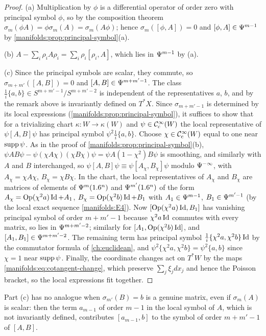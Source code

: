 \begin{proof}
(a) Multiplication by $\phi$ is a differential operator of order zero with
principal symbol $\phi$, so by the composition theorem $\sigma_m(\phi A)=\phi\sigma_m(A)=\sigma_m(A\phi)$;
hence $\sigma_m([\phi,A])=0$ and $[\phi,A]\in\Psi^{m-1}$ by
\cref{manifolds:prop:principal-symbol}(a).

(b) $A-\sum_i\rho_iA\rho_i=\sum_i\rho_i[\rho_i,A]$, which lies in $\Psi^{m-1}$ by (a).

(c) Since the principal symbols are scalar, they commute, so
$\sigma_{m+m'}([A,B])=0$ and $[A,B]\in\Psi^{m+m'-1}$. The class
$\frac1i\{a,b\}\in S^{m+m'-1}/S^{m+m'-2}$ is independent of the representatives
$a$, $b$, and by the remark above is invariantly defined on $T^*X$. Since
$\sigma_{m+m'-1}$ is determined by its local expressions
(\cref{manifolds:prop:principal-symbol}), it suffices to show that for a
trivializing chart $\kappa:W\to\kappa(W)$ and $\psi\in\mathcal{C}^\infty_{\mathrm{c}}(W)$ the local
representative of $\psi[A,B]\psi$ has principal symbol $\psi^2\frac1i\{a,b\}$.
Choose $\chi\in\mathcal{C}^\infty_{\mathrm{c}}(W)$ equal to one near $\operatorname{supp}\psi$. As in the proof of
\cref{manifolds:prop:principal-symbol}(b), $\psi AB\psi-\psi(\chi A\chi)(\chi
B\chi)\psi=\psi A(1-\chi^2)B\psi$ is smoothing, and similarly with $A$ and $B$
interchanged, so $\psi[A,B]\psi\equiv\psi[A_\chi,B_\chi]\psi$ modulo
$\Psi^{-\infty}$, with $A_\chi=\chi A\chi$, $B_\chi=\chi B\chi$. In the chart,
the local representatives of $A_\chi$ and $B_\chi$ are matrices of elements of
$\Psi^{m}(1.6^n)$ and $\Psi^{m'}(1.6^n)$ of the form
$A_\chi=\operatorname{Op}(\chi^2a)\operatorname{Id}+A_1$, $B_\chi=\operatorname{Op}(\chi^2b)\operatorname{Id}+B_1$ with
$A_1\in\Psi^{m-1}$, $B_1\in\Psi^{m'-1}$ (by the local exact sequence
\ref{manifolds:E4}). Now $[\operatorname{Op}(\chi^2a)\operatorname{Id},B_1]$ has vanishing principal symbol of
order $m+m'-1$ because $\chi^2a\operatorname{Id}$ commutes with every matrix, so lies in
$\Psi^{m+m'-2}$; similarly for $[A_1,\operatorname{Op}(\chi^2b)\operatorname{Id}]$, and
$[A_1,B_1]\in\Psi^{m+m'-2}$. The remaining term has principal symbol
$\frac1i\{\chi^2a,\chi^2b\}\operatorname{Id}$ by the commutator formula of
\cref{ch:euclidean}, and $\psi^2\{\chi^2a,\chi^2b\}=\psi^2\{a,b\}$ since
$\chi=1$ near $\operatorname{supp}\psi$. Finally, the coordinate changes act on $T^*W$ by the
maps \eqref{manifolds:eq:cotangent-change}, which preserve $\sum_j\xi_jdx_j$ and
hence the Poisson bracket, so the local expressions fit together.
\end{proof}

Part (c) has no analogue when $\sigma_{m'}(B)=b$ is a genuine matrix, even if
$\sigma_m(A)$ is scalar: then the term $a_{m-1}$ of order $m-1$ in the local
symbol of $A$, which is not invariantly defined, contributes $[a_{m-1},b]$ to
the symbol of order $m+m'-1$ of $[A,B]$.

